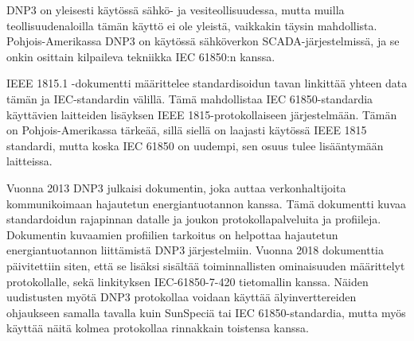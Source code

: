   DNP3 on yleisesti käytössä sähkö- ja vesiteollisuudessa, mutta muilla teollisuudenaloilla tämän käyttö ei ole yleistä, vaikkakin täysin mahdollista. Pohjois-Amerikassa DNP3 on käytössä sähköverkon SCADA-järjestelmissä, ja se onkin osittain kilpaileva tekniikka IEC 61850:n kanssa. 

  IEEE 1815.1 -dokumentti määrittelee standardisoidun tavan linkittää yhteen data tämän ja IEC-standardin välillä. Tämä mahdollistaa IEC 61850-standardia käyttävien laitteiden lisäyksen IEEE 1815-protokollaiseen järjestelmään. Tämän on Pohjois-Amerikassa tärkeää, sillä siellä on laajasti käytössä IEEE 1815 standardi, mutta koska IEC 61850 on uudempi, sen osuus tulee lisääntymään laitteissa.

  Vuonna 2013 DNP3 julkaisi dokumentin, joka auttaa verkonhaltijoita kommunikoimaan hajautetun energiantuotannon kanssa. Tämä dokumentti kuvaa standardoidun rajapinnan datalle ja joukon protokollapalveluita ja profiileja. Dokumentin kuvaamien profiilien tarkoitus on helpottaa hajautetun energiantuotannon liittämistä DNP3 järjestelmiin. Vuonna 2018 dokumenttia päivitettiin siten, että se lisäksi sisältää toiminnallisten ominaisuuden määrittelyt protokollalle, sekä linkityksen IEC-61850-7-420 tietomallin kanssa. Näiden uudistusten myötä DNP3 protokollaa voidaan käyttää älyinverttereiden ohjaukseen samalla tavalla kuin SunSpeciä tai IEC 61850-standardia, mutta myös käyttää näitä kolmea protokollaa rinnakkain toistensa kanssa.